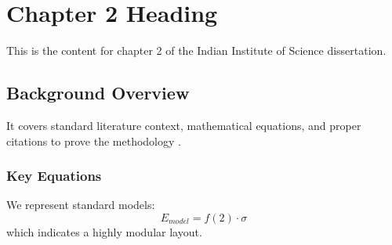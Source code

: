 \chapter{Chapter 2 Heading}
\label{ch:chapter2}
This is the content for chapter 2 of the Indian Institute of Science dissertation.

\section{Background Overview}
It covers standard literature context, mathematical equations, and proper citations to prove the methodology \cite{texbook}.

\subsection{Key Equations}
We represent standard models:
\begin{equation}
    E_{model} = f(2) \cdot \sigma
\end{equation}
which indicates a highly modular layout.
